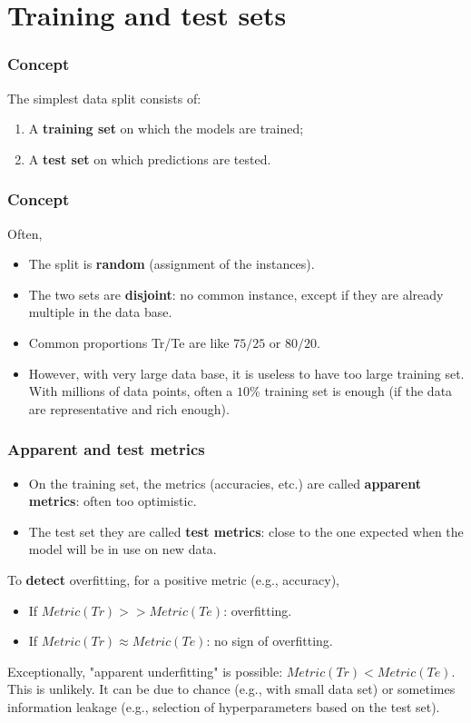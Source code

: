 \section{Training and test sets}
\begin{frame}
\frametitle{Concept}
The simplest data split consists of:
\begin{enumerate}
\item A {\bf training set} on which the models are trained;
\item A {\bf test set} on which predictions are tested.
\end{enumerate}
\end{frame}
\begin{frame}
\frametitle{Concept}
Often,
\begin{itemize}
\item The split is {\bf random} (assignment of the instances).
\item The two sets are {\bf disjoint}: no common instance, except if they are already multiple in the data base. 
\item Common proportions Tr/Te are like $75/25$ or $80/20$. 
\item However, with very large data base, it is useless to have too large training set. With millions of data points, often a $10\%$ training set is enough (if the data are representative and rich enough).
\end{itemize}
\end{frame}
\begin{frame}
\frametitle{Apparent and test metrics}
\begin{itemize}
\item On the training set, the metrics (accuracies, etc.) are called {\bf apparent metrics}: often too optimistic. 
\item The test set they are called {\bf test metrics}: close to the one expected when the model will be in use on new data.
\end{itemize}
To {\bf detect} overfitting, for a positive metric (e.g., accuracy),
\begin{itemize}
\item If $Metric(Tr) >> Metric(Te)$: overfitting.
\item If $Metric(Tr) \approx Metric(Te)$: no sign of overfitting.
\end{itemize}
\vspace{0.2cm}
Exceptionally, "apparent underfitting" is possible: $Metric(Tr) < Metric(Te)$. This is unlikely. It can be due to chance (e.g., with small data set) or sometimes information leakage (e.g., selection of hyperparameters based on the test set). 
\end{frame}
